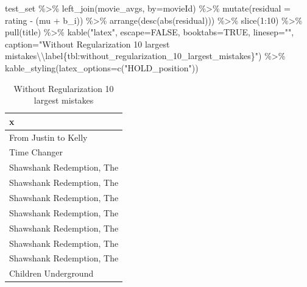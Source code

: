 \documentclass[
]{article}
\newenvironment{Shaded}{}{}
\newcommand{\AttributeTok}[1]{\textcolor[rgb]{0.49,0.56,0.16}{#1}}
\newcommand{\ConstantTok}[1]{\textcolor[rgb]{0.53,0.00,0.00}{#1}}
\newcommand{\DecValTok}[1]{\textcolor[rgb]{0.25,0.63,0.44}{#1}}
\newcommand{\FunctionTok}[1]{\textcolor[rgb]{0.02,0.16,0.49}{#1}}
\newcommand{\NormalTok}[1]{#1}
\newcommand{\SpecialCharTok}[1]{\textcolor[rgb]{0.25,0.44,0.63}{#1}}
\newcommand{\StringTok}[1]{\textcolor[rgb]{0.25,0.44,0.63}{#1}}
\begin{document}
\begin{Shaded}
\begin{Highlighting}[]
\NormalTok{test\_set }\SpecialCharTok{\%\textgreater{}\%} 
  \FunctionTok{left\_join}\NormalTok{(movie\_avgs, }\AttributeTok{by=}\StringTok{\textquotesingle{}movieId\textquotesingle{}}\NormalTok{) }\SpecialCharTok{\%\textgreater{}\%}
  \FunctionTok{mutate}\NormalTok{(}\AttributeTok{residual =}\NormalTok{ rating }\SpecialCharTok{{-}}\NormalTok{ (mu }\SpecialCharTok{+}\NormalTok{ b\_i)) }\SpecialCharTok{\%\textgreater{}\%}
  \FunctionTok{arrange}\NormalTok{(}\FunctionTok{desc}\NormalTok{(}\FunctionTok{abs}\NormalTok{(residual))) }\SpecialCharTok{\%\textgreater{}\%}  
  \FunctionTok{slice}\NormalTok{(}\DecValTok{1}\SpecialCharTok{:}\DecValTok{10}\NormalTok{) }\SpecialCharTok{\%\textgreater{}\%} 
  \FunctionTok{pull}\NormalTok{(title) }\SpecialCharTok{\%\textgreater{}\%} 
    \FunctionTok{kable}\NormalTok{(}\StringTok{"latex"}\NormalTok{, }\AttributeTok{escape=}\ConstantTok{FALSE}\NormalTok{, }\AttributeTok{booktabs=}\ConstantTok{TRUE}\NormalTok{, }\AttributeTok{linesep=}\StringTok{""}\NormalTok{, }
          \AttributeTok{caption=}\StringTok{"Without Regularization 10 largest mistakes}\SpecialCharTok{\textbackslash{}\textbackslash{}}\StringTok{label\{tbl:without\_regularization\_10\_largest\_mistakes\}"}\NormalTok{) }\SpecialCharTok{\%\textgreater{}\%} 
      \FunctionTok{kable\_styling}\NormalTok{(}\AttributeTok{latex\_options=}\FunctionTok{c}\NormalTok{(}\StringTok{"HOLD\_position"}\NormalTok{))}
\end{Highlighting}
\end{Shaded}

\begin{table}[H]

\caption{\label{tab:reg_1_m_1}Without Regularization 10 largest mistakes\label{tbl:without_regularization_10_largest_mistakes}}
\centering
\begin{tabular}[t]{l}
\toprule
x\\
\midrule
From Justin to Kelly\\
Time Changer\\
Shawshank Redemption, The\\
Shawshank Redemption, The\\
Shawshank Redemption, The\\
Shawshank Redemption, The\\
Shawshank Redemption, The\\
Shawshank Redemption, The\\
Shawshank Redemption, The\\
Children Underground\\
\bottomrule
\end{tabular}
\end{table}
\end{document}
